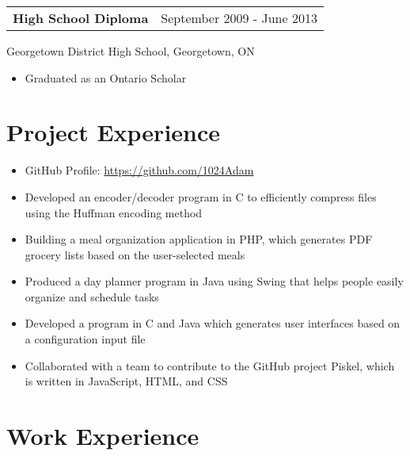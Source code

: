 \documentclass[12pt]{article}
\newcommand{\doublespace}{\vspace{8pt}}
\begin{document}
\doublespace

{
  \small
  \noindent\begin{tabu} {@{} X[l] X[r]}
    \textbf{High School Diploma} & September 2009 - June 2013
  \end{tabu}
  Georgetown District High School, Georgetown, ON
  \begin{itemize}
    \item Graduated as an Ontario Scholar
  \end{itemize}
}

\doublespace

\section{Project Experience}

\doublespace

{
  \small
  \begin{itemize}
    \item GitHub Profile: \href{https://github.com/1024Adam}{https://github.com/1024Adam}
    \item Developed an encoder/decoder program in C to efficiently compress files using the Huffman encoding method
    \item Building a meal organization application in PHP, which generates PDF grocery lists based on the user-selected meals
    \item Produced a day planner program in Java using Swing that helps people easily organize and schedule tasks
    \item Developed a program in C and Java which generates user interfaces based on a configuration input file
    \item Collaborated with a team to contribute to the GitHub project Piskel, which is written in JavaScript, HTML, and CSS
  \end{itemize}
}

\newpage
\pagestyle{normal}

\section{Work Experience}

\doublespace
\end{document}
